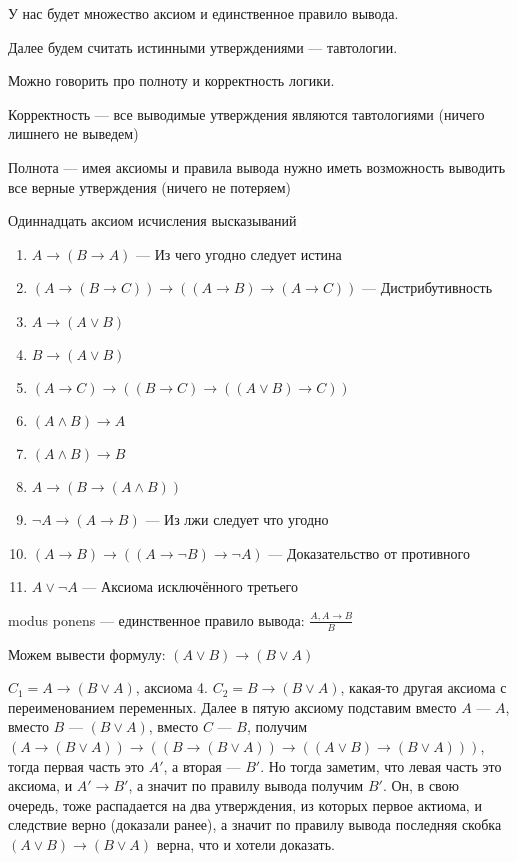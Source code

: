 У нас будет множество аксиом и единственное правило вывода.

Далее будем считать истинными утверждениями --- тавтологии.

Можно говорить про полноту и корректность логики.

\begin{definition}
	Корректность --- все выводимые утверждения являются тавтологиями (ничего лишнего не выведем)

	Полнота --- имея аксиомы и правила вывода нужно иметь возможность выводить все верные утверждения (ничего не потеряем)
\end{definition}

\begin{definition}
Одиннадцать аксиом исчисления высказываний 
\begin{enumerate}
	\item{$A \to (B \to A)$ --- Из чего угодно следует истина}
	\item{$(A \to (B \to C)) \to ((A \to B) \to (A \to C)) $ --- Дистрибутивность}
	\item{$A \to (A \lor B)$}
	\item{$B \to (A \lor B)$}
	\item{$(A \to C) \to ((B \to C) \to ((A \lor B) \to C))$}
	\item{$(A \land B) \to A$}
	\item{$(A \land B) \to B$}
	\item{$A \to (B \to (A \land B))$}
	\item{$\lnot A \to (A \to B)$ --- Из лжи следует что угодно}
	\item{$(A \to B) \to ((A \to \lnot B) \to \lnot A)$ --- Доказательство от противного }
	\item{$A \lor \lnot A$ --- Аксиома исключённого третьего}
\end{enumerate}
\end{definition}

\begin{definition}
	modus ponens --- единственное правило вывода: $\frac{A, A \to B}{B}$
\end{definition}

\begin{example}
Можем вывести формулу: $(A \lor B) \to (B \lor A)$

$C_1 = A \to (B \lor A)$, аксиома 4. $C_2 = B \to (B \lor A)$, какая-то другая аксиома с переименованием переменных. Далее в пятую аксиому подставим вместо $A$ --- $A$, вместо $B$ --- $(B \lor A)$, вместо $C$ --- $B$, получим $(A \to (B \lor A)) \to ((B \to (B \lor A)) \to ((A \lor B) \to (B \lor A)))$, тогда первая часть это $A'$, а вторая --- $B'$. Но тогда заметим, что левая часть это аксиома, и $A' \to B'$, а значит по правилу вывода получим $B'$. Он, в свою очередь, тоже распадается на два утверждения, из которых первое актиома, и следствие верно (доказали ранее), а значит по правилу вывода последняя скобка $(A \lor B) \to (B \lor A)$ верна, что и хотели доказать.
\end{example}


